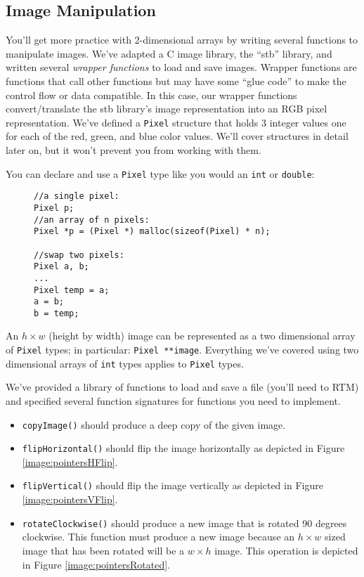\documentclass[12pt]{scrartcl}
\begin{document}
\subsection*{Image Manipulation}

You'll get more practice with 2-dimensional arrays by writing several
functions to manipulate images.  We've adapted a C image library, the 
``stb'' library, and written several \emph{wrapper functions} to load
and save images.  Wrapper functions are functions that call other
functions but may have some ``glue code'' to make the control flow or
data compatible.  In this case, our wrapper functions convert/translate
the stb library's image representation into an RGB pixel representation.
We've defined a \texttt{Pixel} structure that holds 3 integer
values one for each of the red, green, and blue color values.  We'll
cover structures in detail later on, but it won't prevent you from working
with them.  

You can declare and use a \texttt{Pixel} type like you would 
an \texttt{int} or \texttt{double}: 

\begin{figure}[H]
\begin{verbatim}
//a single pixel:
Pixel p;
//an array of n pixels:
Pixel *p = (Pixel *) malloc(sizeof(Pixel) * n);

//swap two pixels:
Pixel a, b;
...
Pixel temp = a;
a = b;
b = temp;
\end{verbatim} 
\end{figure}

An $h \times w$ (height by width) image can be represented as a two dimensional
array of \texttt{Pixel} types; in particular: \texttt{Pixel **image}.
Everything we've covered using two dimensional arrays of \texttt{int} types
applies to \texttt{Pixel} types.

We've provided a library of functions to load and save a file (you'll need to 
RTM) and specified several function signatures for functions you need to
implement.  
\begin{itemize}
  \item \texttt{copyImage()} should produce a deep copy of the given
  image.

  \item \texttt{flipHorizontal()} should flip the image horizontally
  as depicted in Figure \ref{image:pointersHFlip}.  

  \item \texttt{flipVertical()} should flip the image vertically as
  depicted in Figure \ref{image:pointersVFlip}.

  \item \texttt{rotateClockwise()} should produce a new image that
  is rotated 90 degrees clockwise.  This function must produce a new image
  because an $h \times w$ sized image that has been rotated will be a 
  $w \times h$ image.  This operation is depicted in Figure \ref{image:pointersRotated}.

\end{itemize}  
\end{document}
